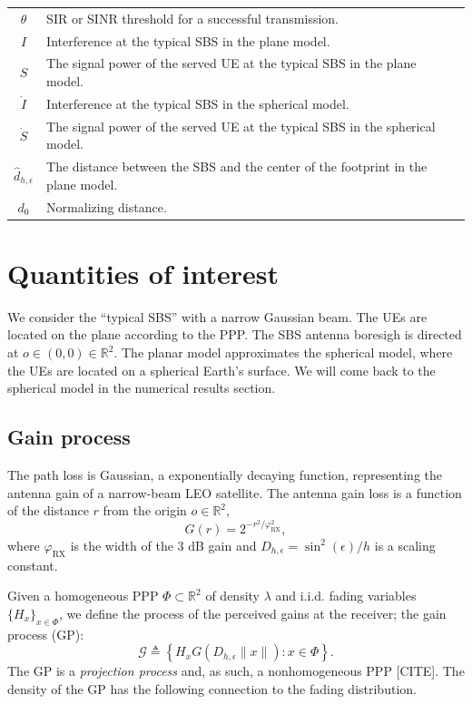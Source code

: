 \documentclass[lettersize,journal]{IEEEtran}
\newcommand{\R}{\mathbb{R}}
\begin{document}
\begin{table}
\begin{center}
\begin{tabular}{| c | p{4.5cm}  |p{1.5cm}|}
      $\theta$ & SIR or SINR threshold for a successful transmission.&\\
      $I$ & Interference at the typical SBS in the plane model.&\\
      $S$ & The signal power of the served UE at the typical SBS in the plane model.&\\
      $\mathring{I}$ & Interference at the typical SBS in the spherical model.&\\
      $\mathring{S}$ & The signal power of the served UE at the typical SBS in the spherical model.&\\ 
      $\hat{d}_{h,\epsilon}$ & The distance between the SBS and the center of the footprint in the plane model.&\\
      $d_{0}$ & Normalizing distance. & \\                        
      \hline
    \end{tabular}
  \end{center}
\end{table}   


\section{Quantities of interest}
\label{sec:analysissec}
We consider the ``typical SBS'' with a narrow Gaussian beam. The UEs are located on the plane according to the PPP. The SBS antenna boresigh is directed at $\textit{o} \in (0,0) \in \R^2$. The planar model approximates the spherical model, where the UEs are located on a spherical Earth's surface. We will come back to the spherical model in the numerical results section.



\subsection{Gain process}
The path loss is Gaussian, a exponentially decaying function, representing the antenna gain of a narrow-beam LEO satellite. The antenna gain loss is a function of the distance $r$ from the origin $\textit{o}\in \R^2$, 
\begin{equation}
  G(r) = 2^{-r^2/\varphi^2_{\text{RX}}},
\end{equation}
where $\varphi_{\text{RX}}$ is the width of the $3$ dB gain and $D_{h,\epsilon}=\sin^2(\epsilon)/h$ is a scaling constant. 

Given a homogeneous PPP $\Phi \subset \R^2$ of density $\lambda$ and i.i.d. fading variables $\{H_x\}_{x\in\Phi}$, we define the process of the perceived gains at the receiver; the gain process (GP):
\begin{equation}
  \label{eq:gainprocess}
  \mathcal{G} \triangleq \left\{ H_x G(D_{h,\epsilon}\|x\|):x \in \Phi  \right\}.
\end{equation}
The GP is a \textit{projection process} and, as such, a nonhomogeneous PPP [CITE]. The density of the GP has the following connection to the fading distribution.
\end{document}
